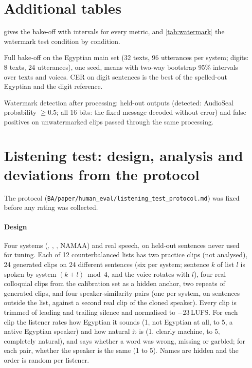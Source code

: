 \section{Additional tables}\label{app:tables}

 gives the bake-off with intervals for every metric, and \cref{tab:watermark} the watermark
test condition by condition.

\begin{table}[H]
\centering\small
\caption{Full bake-off on the Egyptian main set (32 texts, 96 utterances per system; digits: 8 texts, 24 utterances),
one seed, means with two-way bootstrap 95\% intervals over texts and voices. CER on digit sentences is the best of the
spelled-out Egyptian and the digit reference.}
\label{tab:bakeoff_full}
\begin{adjustbox}{max width=\linewidth}
\end{adjustbox}
\end{table}

\begin{table}[H]
\centering\small
\caption{Watermark detection after processing:  held-out \BA outputs (detected: AudioSeal probability
$\geq 0.5$; all 16 bits: the fixed message decoded without error) and false positives on 
unwatermarked clips passed through the same processing.}
\label{tab:watermark}
\begin{adjustbox}{max width=\linewidth}
\end{adjustbox}
\end{table}

\section{Listening test: design, analysis and deviations from the protocol}\label{app:listening}
The protocol (\texttt{BA/paper/human\_eval/listening\_test\_protocol.md}) was fixed before any rating was collected.

\paragraph{Design}
Four systems (\BA, \vox, \cbthree, NAMAA) and real speech, on held-out sentences never used for tuning. Each of 12
counterbalanced lists has two practice clips (not analysed), 24 generated clips on 24 different sentences (six per
system; sentence $k$ of list $l$ is spoken by system $(k+l) \bmod 4$, and the voice rotates with $l$), four real
colloquial clips from the calibration set as a hidden anchor, two repeats of generated clips, and four
speaker-similarity pairs (one per system, on sentences outside the list, against a second real clip of the cloned
speaker). Every clip is trimmed of leading and trailing silence and normalised to $-23$\,LUFS. For each clip the
listener rates how Egyptian it sounds (1, not Egyptian at all, to 5, a native Egyptian speaker) and how natural it is
(1, clearly machine, to 5, completely natural), and says whether a word was wrong, missing or garbled; for each pair,
whether the speaker is the same (1 to 5). Names are hidden and the order is random per listener.

